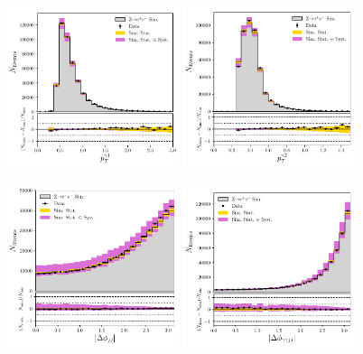 \begin{figure}[h!]
    \begin{center}
        \includegraphics[width=0.45\textwidth]{figures/appendix_zee/lead_ptom_zee_LPS.pdf}
        \includegraphics[width=0.45\textwidth]{figures/appendix_zee/sublead_ptom_zee_LPS.pdf}
    \end{center}
    \begin{center}
        \includegraphics[width=0.45\textwidth]{figures/appendix_zee/dphi_jetjet_zee_LPS.pdf}
        \includegraphics[width=0.45\textwidth]{figures/appendix_zee/dphi_gamgamjetjet_zee_LPS.pdf}

\end{center}
\end{figure}
